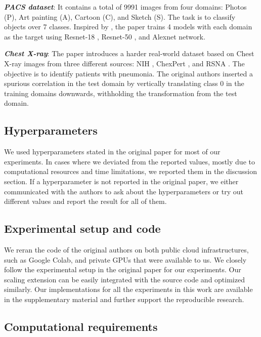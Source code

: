 \textbf{\textit{PACS dataset}}: It contains a total of 9991 images from four domains: Photos (P), Art painting (A), Cartoon (C), and Sketch (S). The task is to classify objects over 7 classes. Inspired by \cite{DBLP:journals/corr/abs-1710-03077, ssdafcvt_PACS}, the paper trains 4 models with each domain as the target using Resnet-18 \cite{resnet18and50}, Resnet-50 \cite{resnet18and50}, and Alexnet \cite{alexnet} network. 

\textbf{\textit{Chest X-ray}}: The paper introduces a harder real-world dataset based on Chest X-ray images from three different sources: NIH \cite{wang2017chestx}, ChexPert \cite{irvin2019chexpert}, and RSNA \cite{Kaggle}. The objective is to identify patients with pneumonia. The original authors inserted a spurious correlation in the test domain by vertically translating class 0 in the training domains downwards, withholding the transformation from the test domain.

\subsection{Hyperparameters}

We used hyperparameters stated in the original paper for most of our experiments. In cases where we deviated from the reported values, mostly due to computational resources and time limitations, we reported them in the discussion section. If a hyperparameter is not reported in the original paper, we either communicated with the authors to ask about the hyperparameters or try out different values and report the result for all of them. 

\subsection{Experimental setup and code}

We reran the code of the original authors on both public cloud infrastructures, such as Google Colab, and private GPUs that were available to us. We closely follow the experimental setup in the original paper for our experiments. Our scaling extension can be easily integrated with the source code and optimized similarly. Our implementations for all the experiments in this work are available in the supplementary material and further support the reproducible research. 

\subsection{Computational requirements}

